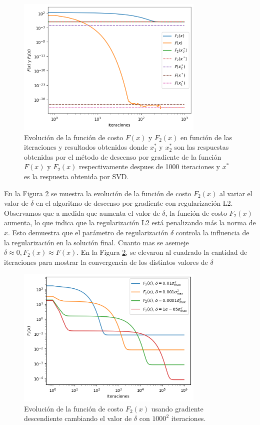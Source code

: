 \documentclass[12pt,a4]{article} %
\begin{document}
\begin{figure}[H]
    \centering
    \includegraphics[width=0.8\textwidth]{f1 f2 iters.png}
    \caption{Evolución de la función de costo \(F(x)\) y \(F_2(x)\) en función de las iteraciones y resultados obtenidos  donde $x_1^*$ y $x_2^*$ son las respuestas obtenidas por el método de descenso por gradiente de la función $F(x)$ y $F_2(x)$ respectivamente despues de 1000 iteraciones y $x^*$ es la respuesta obtenida por SVD.}
    \label{fig:f1_f2}
\end{figure}

En la Figura \ref{fig:f2_delta} se muestra la evolución de la función de costo \(F_2(x)\) al variar el valor de \(\delta\) en el algoritmo de descenso por gradiente con regularización L2. Observamos que a medida que aumenta el valor de \(\delta\), la función de costo \(F_2(x)\) aumenta, lo que indica que la regularización L2 está penalizando más la norma de \(x\). Esto demuestra que el parámetro de regularización \(\delta\) controla la influencia de la regularización en la solución final. Cuanto mas se asemeje $\delta \approx 0, F_2(x) \approx F(x)$. En la Figura \ref{fig:f2_delta}, se elevaron al cuadrado la cantidad de iteraciones para mostrar la convergencia de los  distintos valores de $\delta$


\begin{figure}[H]
    \centering
    \includegraphics[width=0.8\textwidth]{vary delta f2.png}
    \caption{Evolución de la función de costo \(F_2(x)\) usando gradiente descendiente cambiando el valor de \(\delta\) con $1000^2$ iteraciones.}
    \label{fig:f2_delta}
\end{figure}
\end{document}
